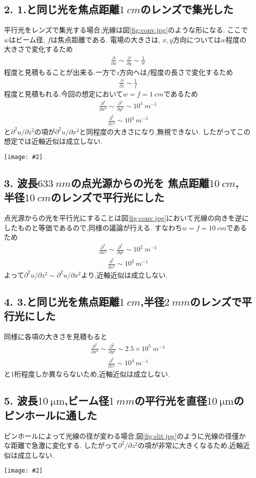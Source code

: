 \documentclass[uplatex,a4j,11pt,dvipdfmx]{jsarticle}
\makeatletter
\def\fgcaption{\def\@captype{figure}\caption}
\newcommand{\mfig}[3][width=15cm]{
\begin{center}
\texttt{[image: \#2]}
\fgcaption{#3 \label{fig:#2}}
\end{center}
}
\numberwithin{equation}{section}
\makeatother
\begin{document}
\subsection*{2. 1.と同じ光を焦点距離$1\ \si{cm}$のレンズで集光した}
平行光をレンズで集光する場合,光線は図\ref{fig:conv.jpg}のような形になる.
ここで$w$はビーム径, $f$は焦点距離である.
電場の大きさは, $x,y$方向については$w$程度の大きさで変化するため
\begin{align}
  \frac{\partial}{\partial x}\sim\frac{\partial}{\partial y}\sim\frac{1}{w}
\end{align}
程度と見積もることが出来る.一方で$z$方向へは$f$程度の長さで変化するため
\begin{align}
  \frac{\partial}{\partial z}\sim\frac{1}{f}
\end{align}
程度と見積もれる.今回の想定において$w=f=1\ \si{cm}$であるため
\begin{align}
  \frac{\partial^2}{\partial x^2}\sim\frac{\partial^2}{\partial y^2}\sim10^4\ \si{m^{-1}}
\end{align}
\begin{align}
  \frac{\partial^2}{\partial z^2}\sim10^4\ \si{m^{-1}}
\end{align}
と$\partial^2 u/\partial z^2$の項が$\partial^2 u/\partial x^2$と同程度の大きさになり,無視できない.
したがってこの想定では近軸近似は成立しない.
\mfig[width=8cm]{conv.jpg}{集光の模式図}
\subsection*{3. 波長$633\ \si{nm}$の点光源からの光を
焦点距離$10\ \si{cm}$, 半径$10\ \si{cm}$のレンズで平行光にした}
点光源からの光を平行光にすることは図\ref{fig:conv.jpg}において光線の向きを逆にしたものと等価であるので,同様の議論が行える.
すなわち$w=f=10\ \si{cm}$であるため
\begin{align}
  \frac{\partial^2}{\partial x^2}\sim\frac{\partial^2}{\partial y^2}\sim10^2\ \si{m^{-1}}
\end{align}
\begin{align}
  \frac{\partial^2}{\partial z^2}\sim10^2\ \si{m^{-1}}
\end{align}
よって$\partial^2 u/\partial z^2\sim\partial^2 u/\partial x^2$より,近軸近似は成立しない.
\subsection*{4. 3.と同じ光を焦点距離$1\ \si{cm}$,半径$2\ \si{mm}$のレンズで平行光にした}
同様に各項の大きさを見積もると
\begin{align}
  \frac{\partial^2}{\partial x^2}\sim\frac{\partial^2}{\partial y^2}\sim2.5\times10^5\ \si{m^{-1}}
\end{align}
\begin{align}
  \frac{\partial^2}{\partial z^2}\sim10^4\ \si{m^{-1}}
\end{align}
と1桁程度しか異ならないため,近軸近似は成立しない.
\subsection*{5. 波長$10\ \si{\micro\metre}$,ビーム径$1\ \si{mm}$の平行光を直径$10\ \si{\micro\metre}$のピンホールに通した}
ピンホールによって光線の径が変わる場合,図\ref{fig:slit.jpg}のように光線の径僅かな距離で急激に変化する.
したがって$\partial^2/\partial z^2$の項が非常に大きくなるため,近軸近似は成立しない.
\mfig[width=8cm]{slit.jpg}{スリットによる光線の変化}
\end{document}
